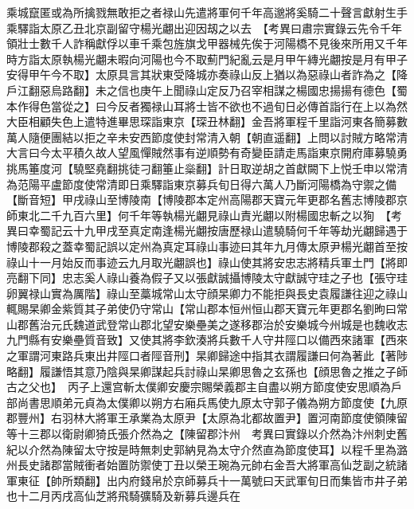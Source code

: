 乘城竄匿或為所擒戮無敢拒之者禄山先遣將軍何千年高邈將奚騎二十聲言獻射生手乘驛詣太原乙丑北京副留守楊光翽出迎因刼之以去　【考異曰肅宗實錄云先令千年領壯士數千人詐稱獻俘以車千乘包旌旗戈甲器械先俟于河陽橋不見後來所用又千年時方詣太原執楊光翽未暇向河陽也今不取薊門紀亂云是月甲午縳光翽按是月有甲子安得甲午今不取】太原具言其狀東受降城亦奏祿山反上猶以為惡祿山者詐為之【降戶江翻惡烏路翻】未之信也庚午上聞祿山定反乃召宰相謀之楊國忠揚揚有德色【蜀本作得色當從之】曰今反者獨禄山耳將士皆不欲也不過旬日必傳首詣行在上以為然大臣相顧失色上遣特進畢思琛詣東京【琛丑林翻】金吾將軍程千里詣河東各簡募數萬人隨便團結以拒之辛未安西節度使封常清入朝【朝直遥翻】上問以討賊方略常清大言曰今太平積久故人望風憚賊然事有逆順勢有奇變臣請走馬詣東京開府庫募驍勇挑馬箠度河【驍堅堯翻挑徒刁翻箠止橤翻】計日取逆胡之首獻闕下上悦壬申以常清為范陽平盧節度使常清即日乘驛詣東京募兵旬日得六萬人乃斷河陽橋為守禦之備【斷音短】甲戌祿山至博陵南【博陵郡本定州高陽郡天寶元年更郡名舊志博陵郡京師東北二千九百六里】何千年等執楊光翽見祿山責光翽以附楊國忠斬之以狥　【考異曰幸蜀記云十九甲戌至真定南逢楊光翽按唐歷禄山遣驍騎何千年等劫光翽歸遇于博陵郡殺之蓋幸蜀記誤以定州為真定耳祿山事迹曰其年九月傳太原尹楊光翽首至按祿山十一月始反而事迹云九月取光翽誤也】祿山使其將安忠志將精兵軍土門【將即亮翻下同】忠志奚人祿山養為假子又以張獻誠攝博陵太守獻誠守珪之子也【張守珪卵翼禄山實為厲階】祿山至藁城常山太守顔杲卿力不能拒與長史袁履謙往迎之祿山輒賜杲卿金紫質其子弟使仍守常山【常山郡本恒州恒山郡天寶元年更郡名劉昫曰常山郡舊治元氏魏道武登常山郡北望安樂壘美之遂移郡治於安樂城今州城是也魏收志九門縣有安樂壘質音致】又使其將李欽湊將兵數千人守井陘口以備西來諸軍【西來之軍謂河東路兵東出井陘口者陘音刑】杲卿歸途中指其衣謂履謙曰何為著此【著陟略翻】履謙悟其意乃陰與杲卿謀起兵討祿山杲卿思魯之玄孫也【顔思魯之推之子師古之父也】　丙子上還宫斬太僕卿安慶宗賜榮義郡主自盡以朔方節度使安思順為戶部尚書思順弟元貞為太僕卿以朔方右廂兵馬使九原太守郭子儀為朔方節度使【九原郡豐州】右羽林大將軍王承業為太原尹【太原為北都故置尹】置河南節度使領陳留等十三郡以衛尉卿猗氏張介然為之【陳留郡汴州　考異曰實錄以介然為汴州刺史舊紀以介然為陳留太守按是時無刺史郭納見為太守介然直為節度使耳】以程千里為潞州長史諸郡當賊衝者始置防禦使丁丑以榮王琬為元帥右金吾大將軍高仙芝副之統諸軍東征【帥所類翻】出内府錢帛於京師募兵十一萬號曰天武軍旬日而集皆市井子弟也十二月丙戌高仙芝將飛騎彍騎及新募兵邊兵在

